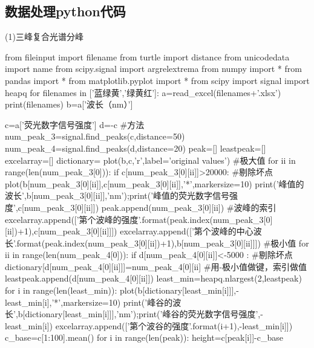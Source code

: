 \documentclass{article}
\numberwithin{equation}{subsection}
\begin{document}
\subsection{数据处理python代码}
(1)三峰复合光谱分峰
\begin{python}
from fileinput import filename
from turtle import distance
from unicodedata import name
from scipy.signal import argrelextrema
from numpy import *
from pandas import *
from matplotlib.pyplot import *
from scipy import signal
import heapq
for filenames in ['蓝绿黄','绿黄红']:
    a=read_excel(filenames+'.xlsx')
    print(filenames)
    b=a['波长（nm）']

    c=a['荧光数字信号强度']
    d=-c
    #方法
    num_peak_3=signal.find_peaks(c,distance=50)
    num_peak_4=signal.find_peaks(d,distance=20)
    peak=[]
    leastpeak=[]
    excelarray=[]
    dictionary={}
    plot(b,c,'r',label='original values')
    #极大值
    for ii in range(len(num_peak_3[0])):
        if c[num_peak_3[0][ii]]>20000:          #剔除坏点
            plot(b[num_peak_3[0][ii]],c[num_peak_3[0][ii]],'*',markersize=10) 
            print('峰值的波长',b[num_peak_3[0][ii]],'nm');print('峰值的荧光数字信号强度',c[num_peak_3[0][ii]])
            peak.append(num_peak_3[0][ii])          #波峰的索引
            excelarray.append(['第{}个波峰的强度'.format(peak.index(num_peak_3[0][ii])+1),c[num_peak_3[0][ii]]])
            excelarray.append(['第{}个波峰的中心波长'.format(peak.index(num_peak_3[0][ii])+1),b[num_peak_3[0][ii]]])
    #极小值
    for ii in range(len(num_peak_4[0])):
        if  d[num_peak_4[0][ii]]<-5000 :          #剔除坏点
            dictionary[d[num_peak_4[0][ii]]]=num_peak_4[0][ii]          #用-极小值做键，索引做值
            leastpeak.append(d[num_peak_4[0][ii]])
    least_min=heapq.nlargest(2,leastpeak)
    for i in range(len(least_min)):
        plot(b[dictionary[least_min[i]]],-least_min[i],'*',markersize=10) 
        print('峰谷的波长',b[dictionary[least_min[i]]],'nm');print('峰谷的荧光数字信号强度',-least_min[i])
        excelarray.append(['第{}个波谷的强度'.format(i+1),-least_min[i]])
    c_base=c[1:100].mean()
    for i in range(len(peak)):  
        height=c[peak[i]]-c_base


\end{python}
\end{document}
